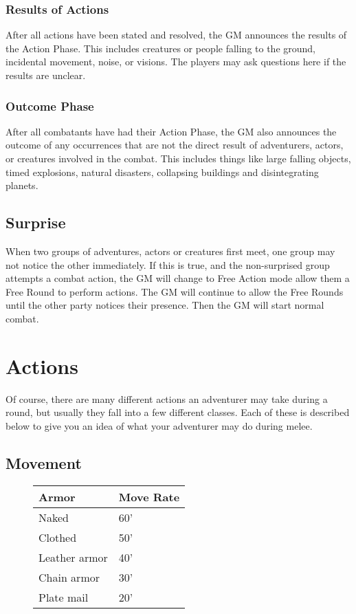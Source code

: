 \begin{multicols}{2}
\subsubsection{Results of Actions}
After all actions have been stated and resolved, the GM announces the results of the Action Phase. This includes creatures or people falling to the ground, incidental movement, noise, or visions. The players may ask questions here if the results are unclear. 
\subsubsection{Outcome Phase}
After all combatants have had their Action Phase, the GM also announces the outcome of any occurrences that are not the direct result of adventurers, actors, or creatures involved in the combat. This includes things like large falling objects, timed explosions, natural disasters, collapsing buildings and disintegrating planets.
\subsection{Surprise}
When two groups of adventures, actors or creatures first meet, one group may not notice the other immediately. If this is true, and the non-surprised group attempts a combat
action, the GM will change to Free Action mode allow them a Free Round to perform actions. The GM will continue to allow the Free Rounds until the other party notices their presence. Then the GM will start normal combat.
\section{Actions}
Of course, there are many different actions an adventurer may take during a round, but usually they fall into a few different classes. Each of these is described below to give you an idea of what your adventurer may do during melee.
\subsection{Movement}
\begin{wrapfigure}[8]{l}[0pt]{115pt}
\begin{normbox}
\small
\begin{tabular}{@{}l l}
\textbf{Armor} & \textbf{Move Rate}\\
\midrule
Naked & 60'\\
Clothed & 50'\\
Leather armor & 40'\\
Chain armor & 30'\\
Plate mail & 20'\\
\end{tabular}
\end{normbox}
\end{wrapfigure}


\end{multicols}
